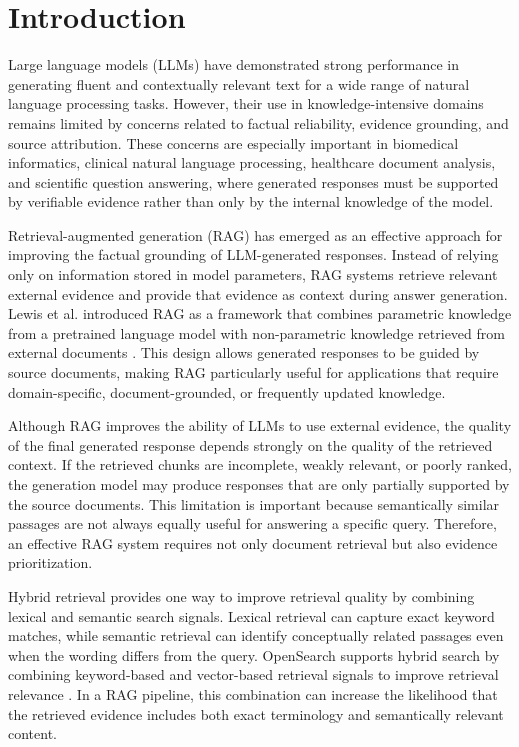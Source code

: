 \section{Introduction}

Large language models (LLMs) have demonstrated strong performance in generating fluent and contextually relevant text for a wide range of natural language processing tasks. However, their use in knowledge-intensive domains remains limited by concerns related to factual reliability, evidence grounding, and source attribution. These concerns are especially important in biomedical informatics, clinical natural language processing, healthcare document analysis, and scientific question answering, where generated responses must be supported by verifiable evidence rather than only by the internal knowledge of the model.

Retrieval-augmented generation (RAG) has emerged as an effective approach for improving the factual grounding of LLM-generated responses. Instead of relying only on information stored in model parameters, RAG systems retrieve relevant external evidence and provide that evidence as context during answer generation. Lewis et al. introduced RAG as a framework that combines parametric knowledge from a pretrained language model with non-parametric knowledge retrieved from external documents \cite{lewis2020rag}. This design allows generated responses to be guided by source documents, making RAG particularly useful for applications that require domain-specific, document-grounded, or frequently updated knowledge.

Although RAG improves the ability of LLMs to use external evidence, the quality of the final generated response depends strongly on the quality of the retrieved context. If the retrieved chunks are incomplete, weakly relevant, or poorly ranked, the generation model may produce responses that are only partially supported by the source documents. This limitation is important because semantically similar passages are not always equally useful for answering a specific query. Therefore, an effective RAG system requires not only document retrieval but also evidence prioritization.

Hybrid retrieval provides one way to improve retrieval quality by combining lexical and semantic search signals. Lexical retrieval can capture exact keyword matches, while semantic retrieval can identify conceptually related passages even when the wording differs from the query. OpenSearch supports hybrid search by combining keyword-based and vector-based retrieval signals to improve retrieval relevance \cite{opensearchhybrid}. In a RAG pipeline, this combination can increase the likelihood that the retrieved evidence includes both exact terminology and semantically relevant content.

